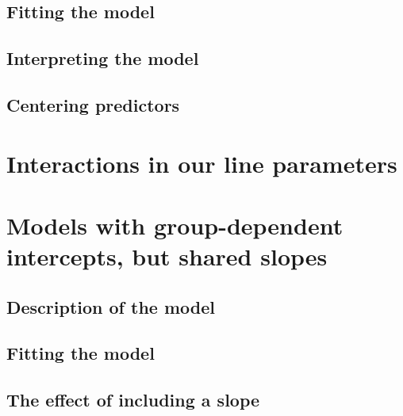 \documentclass[
]{book}
\begin{document}
\hypertarget{fitting-the-model-3}{%
\subsection{Fitting the model}\label{fitting-the-model-3}}

\hypertarget{interpreting-the-model-2}{%
\subsection{Interpreting the model}\label{interpreting-the-model-2}}

\hypertarget{centering-predictors}{%
\subsection{Centering predictors}\label{centering-predictors}}

\hypertarget{interactions-in-our-line-parameters}{%
\section{Interactions in our line parameters}\label{interactions-in-our-line-parameters}}

\hypertarget{models-with-group-dependent-intercepts-but-shared-slopes}{%
\section{Models with group-dependent intercepts, but shared slopes}\label{models-with-group-dependent-intercepts-but-shared-slopes}}

\hypertarget{description-of-the-model-5}{%
\subsection{Description of the model}\label{description-of-the-model-5}}

\hypertarget{fitting-the-model-4}{%
\subsection{Fitting the model}\label{fitting-the-model-4}}

\hypertarget{the-effect-of-including-a-slope}{%
\subsection{The effect of including a slope}\label{the-effect-of-including-a-slope}}
\end{document}
